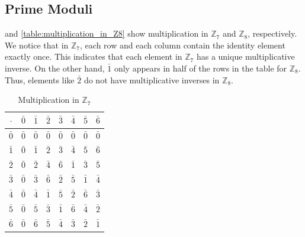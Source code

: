 \documentclass[10pt, titlepage]{amsart}
\newcommand\Z{{\mathbb Z}}
\theoremstyle{definition}
\begin{document}
	\subsection{Prime Moduli}
	
	 and \cref{table:multiplication_in_Z8} show multiplication in $\Z_7$ and $\Z_8$, respectively.
	We notice that in $\Z_7$, each row and each column contain the identity element exactly once.
	This indicates that each element in $\Z_7$ has a unique multiplicative inverse.
	On the other hand, $\bar{1}$ only appears in half of the rows in the table for $\Z_8$. Thus, elements like $\bar{2}$ do not have multiplicative inverses in $\Z_8$.
	
	\begin{table}[h!]
		\centering
		\begin{minipage}{0.48\textwidth}
			\centering
			\caption{Multiplication in $\Z_7$}
			\label{table:multiplication_in_Z7}
			\begin{tabular}{|c|c|c|c|c|c|c|c|}
				\hline
				$\cdot$		& $\bar{0}$ & $\bar{1}$ & $\bar{2}$ & $\bar{3}$ & $\bar{4}$ & $\bar{5}$ & $\bar{6}$ \\ \hline
				$\bar{0}$	& $\bar{0}$ & $\bar{0}$ & $\bar{0}$ & $\bar{0}$ & $\bar{0}$ & $\bar{0}$ & $\bar{0}$ \\ \hline
				$\bar{1}$	& $\bar{0}$ & \cellcolor[HTML]{9AFF99}$\bar{1}$ & $\bar{2}$ & $\bar{3}$ & $\bar{4}$ & $\bar{5}$ & $\bar{6}$ \\ \hline
				$\bar{2}$	& $\bar{0}$ & $\bar{2}$ & $\bar{4}$ & $\bar{6}$ & \cellcolor[HTML]{9AFF99}$\bar{1}$ & $\bar{3}$ & $\bar{5}$ \\ \hline
				$\bar{3}$	& $\bar{0}$ & $\bar{3}$ & $\bar{6}$ & $\bar{2}$ & $\bar{5}$ & \cellcolor[HTML]{9AFF99}$\bar{1}$ & $\bar{4}$ \\ \hline
				$\bar{4}$	& $\bar{0}$ & $\bar{4}$ & \cellcolor[HTML]{9AFF99}$\bar{1}$ & $\bar{5}$ & $\bar{2}$ & $\bar{6}$ & $\bar{3}$ \\ \hline
				$\bar{5}$	& $\bar{0}$ & $\bar{5}$ & $\bar{3}$ & \cellcolor[HTML]{9AFF99}$\bar{1}$ & $\bar{6}$ & $\bar{4}$ & $\bar{2}$ \\ \hline
				$\bar{6}$	& $\bar{0}$ & $\bar{6}$ & $\bar{5}$ & $\bar{4}$ & $\bar{3}$ & $\bar{2}$ & \cellcolor[HTML]{9AFF99}$\bar{1}$ \\ \hline
			\end{tabular}
		\end{minipage}
		\hfill
		\begin{minipage}{0.48\textwidth}
			\centering

\end{minipage}
\end{table}
\end{document}
